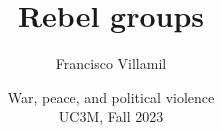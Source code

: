 \documentclass[aspectratio=43]{beamer}
\title{\huge Rebel groups}
\author{Francisco Villamil}
\date{War, peace, and political violence\\UC3M, Fall 2023}
\begin{document}
\begin{frame}
  \titlepage
\end{frame}
\end{document}
